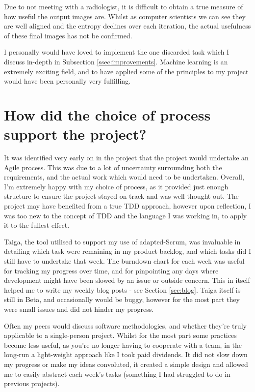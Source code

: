 Due to not meeting with a radiologist, it is difficult to obtain a true measure of how useful the output images are. Whilst as computer scientists we can see they are well aligned and the entropy declines over each iteration, the actual usefulness of these final images has not be confirmed.

I personally would have loved to implement the one discarded task which I discuss in-depth in Subsection \ref{ssec:improvements}. Machine learning is an extremely exciting field, and to have applied some of the principles to my project would have been personally very fulfilling.

\section{How did the choice of process support the project?}

It was identified very early on in the project that the project would undertake an Agile process. This was due to a lot of uncertainty surrounding both the requirements, and the actual work which would need to be undertaken. Overall, I'm extremely happy with my choice of process, as it provided just enough structure to ensure the project stayed on track and was well thought-out. The project may have benefited from a true \acrshort{TDD} approach, however upon reflection, I was too new to the concept of \acrshort{TDD} and the language I was working in, to apply it to the fullest effect.

Taiga, the tool utilised to support my use of adapted-Scrum, was invaluable in detailing which task were remaining in my product backlog, and which tasks did I still have to undertake that week. The burndown chart for each week was useful for tracking my progress over time, and for pinpointing any days where development might have been slowed by an issue or outside concern. This in itself helped me to write my weekly blog posts - see Section \ref{sec:blog}. Taiga itself is still in Beta, and occasionally would be buggy, however for the most part they were small issues and did not hinder my progress.

Often my peers would discuss software methodologies, and whether they're truly applicable to a single-person project. Whilst for the most part some practices become less useful, as you're no longer having to cooperate with a team, in the long-run a light-weight approach like I took paid dividends. It did not slow down my progress or make my ideas convoluted, it created a simple design and allowed me to easily abstract each week's tasks (something I had struggled to do in previous projects).

